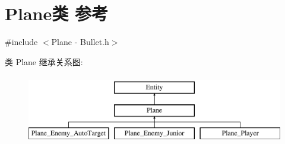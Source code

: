 \hypertarget{class_plane}{}\section{Plane类 参考}
\label{class_plane}


{\ttfamily \#include $<$Plane -\/ Bullet.\+h$>$}

类 Plane 继承关系图\+:\begin{figure}[H]
\begin{center}
\leavevmode
\includegraphics[height=3.000000cm]{class_plane}
\end{center}
\end{figure}
